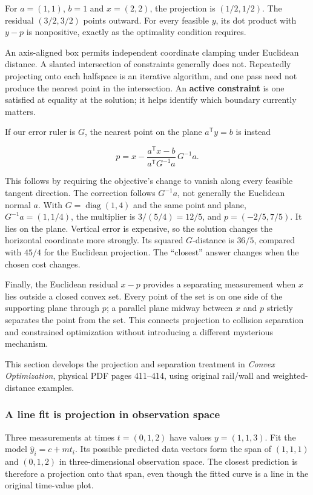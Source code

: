 For \(a=(1,1)\), \(b=1\) and \(x=(2,2)\), the projection is \((1/2,1/2)\). The residual \((3/2,3/2)\) points outward. For every feasible \(y\), its dot product with \(y-p\) is nonpositive, exactly as the optimality condition requires.

An axis-aligned box permits independent coordinate clamping under Euclidean distance. A slanted intersection of constraints generally does not. Repeatedly projecting onto each halfspace is an iterative algorithm, and one pass need not produce the nearest point in the intersection. An \textbf{active constraint} is one satisfied at equality at the solution; it helps identify which boundary currently matters.

If our error ruler is \(G\), the nearest point on the plane \(a^{\mathsf T}y=b\) is instead

\[
p=x-\frac{a^{\mathsf T}x-b}{a^{\mathsf T}G^{-1}a}\,G^{-1}a.
\]

This follows by requiring the objective's change to vanish along every feasible tangent direction. The correction follows \(G^{-1}a\), not generally the Euclidean normal \(a\). With \(G=\operatorname{diag}(1,4)\) and the same point and plane, \(G^{-1}a=(1,1/4)\), the multiplier is \(3/(5/4)=12/5\), and \(p=(-2/5,7/5)\). It lies on the plane. Vertical error is expensive, so the solution changes the horizontal coordinate more strongly. Its squared \(G\)-distance is \(36/5\), compared with \(45/4\) for the Euclidean projection. The ``closest'' answer changes when the chosen cost changes.

Finally, the Euclidean residual \(x-p\) provides a separating measurement when \(x\) lies outside a closed convex set. Every point of the set is on one side of the supporting plane through \(p\); a parallel plane midway between \(x\) and \(p\) strictly separates the point from the set. This connects projection to collision separation and constrained optimization without introducing a different mysterious mechanism.

This section develops the projection and separation treatment in \emph{Convex Optimization}, physical PDF pages 411--414, using original rail/wall and weighted-distance examples.

\subsubsection{A line fit is projection in observation space}\label{a-line-fit-is-projection-in-observation-space}

Three measurements at times \(t=(0,1,2)\) have values \(y=(1,1,3)\). Fit the model \(\widehat y_i=c+mt_i\). Its possible predicted data vectors form the span of \((1,1,1)\) and \((0,1,2)\) in three-dimensional observation space. The closest prediction is therefore a projection onto that span, even though the fitted curve is a line in the original time-value plot.

